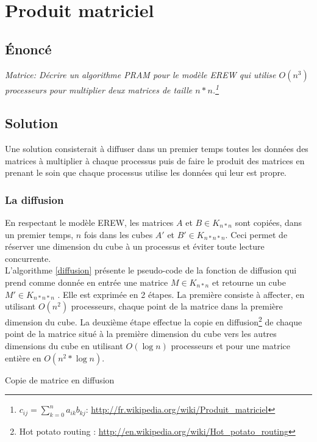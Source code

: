 \section{Produit matriciel}

\subsection{Énoncé}
\textit{Matrice: Décrire un algorithme PRAM pour le modèle EREW qui utilise $O(n^3)$ processeurs pour multiplier deux matrices de taille $n*n$.\footnote{$c_{ij} = \sum_{k=0}^n a_{ik} b_{kj}$: \url{http://fr.wikipedia.org/wiki/Produit_matriciel}}}

\subsection{Solution}
Une solution consisterait à diffuser dans un premier temps toutes les données des matrices à multiplier à chaque processus puis de faire le produit des matrices en prenant le soin que chaque processus utilise les données qui leur est propre.

\subsubsection{La diffusion}
En respectant le modèle EREW, les matrices $A$ et $B \in K_{n*n}$ sont copiées, dans un premier temps, $n$ fois dans les cubes $A'$ et $B' \in K_{n*n*n}$. Ceci permet de réserver une dimension du cube à un processus et éviter toute lecture concurrente.\\

L'algorithme \ref{diffusion} présente le pseudo-code de la fonction de diffusion qui prend comme donnée en entrée une matrice $M \in K_{n*n}$ et retourne un cube $M' \in K_{n*n*n}$ . Elle est exprimée en 2 étapes. La première consiste à affecter, en utilisant $O(n^2)$ processeurs, chaque point de la matrice dans la première dimension du cube. La deuxième étape effectue la copie en diffusion\footnote{Hot potato routing : \url{http://en.wikipedia.org/wiki/Hot_potato_routing}} de chaque point de la matrice situé à la première dimension du cube vers les autres dimensions du cube en utilisant $O(\log{n})$ processeurs et pour une matrice entière en $O(n^2 * \log{n})$.

\incmargin{1em}
\begin{algorithm}[here]
  \dontprintsemicolon
  \caption{Copie de matrice en diffusion}
  \label{diffusion}
\end{algorithm}
\decmargin{1em}

